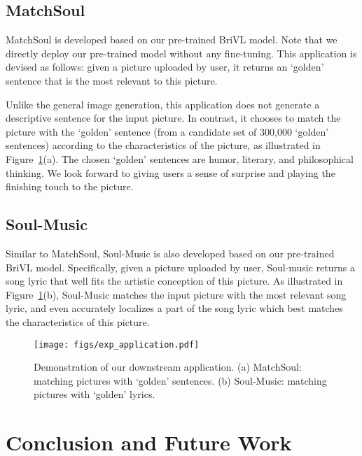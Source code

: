 \documentclass[10pt,twocolumn,letterpaper]{article}
\begin{document}
\subsection{MatchSoul}

MatchSoul is developed based on our pre-trained BriVL model. Note that we directly deploy our pre-trained model without any fine-tuning. This application is devised as follows: given a picture uploaded by user, it returns an `golden' sentence that is the most relevant to this picture.

Unlike the general image generation, this application does not generate a descriptive sentence for the input picture. In contrast, it chooses to match the picture with the `golden' sentence (from a candidate set of 300,000 `golden' sentences) according to the characteristics of the picture, as illustrated in Figure~\ref{fig:exp_application}(a). The chosen `golden' sentences are humor, literary, and philosophical thinking. We look forward to giving users a sense of surprise and playing the finishing touch to the picture.

\subsection{Soul-Music}

Similar to MatchSoul, Soul-Music is also developed based on our pre-trained BriVL model. Specifically, given a picture uploaded by user, Soul-music returns a song lyric that well fits the artistic conception of this picture. As illustrated in Figure~\ref{fig:exp_application}(b), Soul-Music matches the input picture with the most relevant song lyric, and even accurately localizes a part of the song lyric which best matches the characteristics of this picture.

\begin{figure}[t]
    \centering
    \texttt{[image: figs/exp\_application.pdf]}
\caption{
    Demonstration of our downstream application. (a) MatchSoul: matching pictures with `golden' sentences. (b) Soul-Music: matching pictures with `golden' lyrics. }
    \label{fig:exp_application}
\end{figure}

\section{Conclusion and Future Work}
\end{document}
